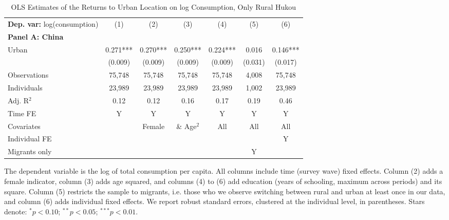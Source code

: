 \begin{table}[htbp] \centering \begin{threeparttable}
 \caption{OLS Estimates of the Returns to Urban Location on log Consumption, Only Rural Hukou} 
 \label{tab:OLS_CHN_hukou_rural_only_consumption_urban_unb} 
\begin{tabular}{l cccccc} \toprule  \textbf{Dep. var:}  log(consumption) 
                    &\multicolumn{1}{c}{(1)}   &\multicolumn{1}{c}{(2)}   &\multicolumn{1}{c}{(3)}   &\multicolumn{1}{c}{(4)}   &\multicolumn{1}{c}{(5)}   &\multicolumn{1}{c}{(6)}   \\
\textbf{Panel A: China} \\
Urban               &       0.271***&       0.270***&       0.250***&       0.224***&       0.016   &       0.146***\\
                    &     (0.009)   &     (0.009)   &     (0.009)   &     (0.009)   &     (0.031)   &     (0.017)   \\
\addlinespace
Observations        &      75,748   &      75,748   &      75,748   &      75,748   &       4,008   &      75,748   \\
Individuals         &      23,989   &      23,989   &      23,989   &      23,989   &       1,002   &      23,989   \\
Adj. R$^{2}$        &        0.12   &        0.12   &        0.16   &        0.17   &        0.19   &        0.46   \\
\cmidrule{2 -7} Time FE & Y & Y & Y & Y & Y & Y \\ Covariates & & Female & \& Age$^2$ & All & All & All \\ Individual FE & & & & & & Y \\ Migrants only & & & & & Y & \\ \bottomrule \end{tabular} \begin{tablenotes}[flushleft] \footnotesize \item{The dependent variable is the log of total consumption per capita. All columns include time (survey wave) fixed effects. Column (2) adds a female indicator, column (3) adds age squared, and columns (4) to (6) add education (years of schooling, maximum across periods) and its square. Column (5) restricts the sample to migrants, i.e. those who we observe switching between rural and urban at least once in our data, and column (6) adds individual fixed effects. We report robust standard errors, clustered at the individual level, in parentheses. Stars denote: $^{*} p<0.10$; $^{**} p<0.05$; $^{***} p<0.01$.} \end{tablenotes} \end{threeparttable} \end{table}
